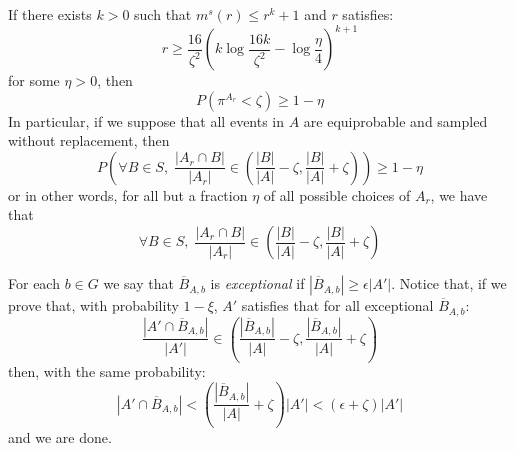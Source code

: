     \begin{remark}[Fact 5.12]\label{fact_5.12}
        If there exists $k > 0$ such that $m^s(r) \leq r^k + 1$ and $r$ satisfies:
        $$
            r \geq \frac{16}{\zeta^2} \left( k \log \frac{16 k}{\zeta^2} - \log \frac{\eta}{4} \right)^{k+1}
        $$
        for some $\eta > 0$, then
        $$
            P\left( \pi^{A_r} < \zeta \right) \geq 1 - \eta
        $$
        In particular, if we suppose that all events in $A$ are equiprobable and sampled without replacement, then
        $$
            P\left( \forall B \in S, \; \frac{\left| A_r \cap B \right|}{\left| A_r \right|} \in
                 \left( \frac{\left| B \right|}{\left| A \right|} -
                 \zeta, \frac{\left| B \right|}{\left| A \right|} + \zeta \right) \right) \geq 1 - \eta
        $$
        or in other words, for all but a fraction $\eta$ of all possible choices of $A_r$, we have that
        $$
            \forall B \in S, \; \frac{\left| A_r \cap B \right|}{\left| A_r \right|} \in
                 \left( \frac{\left| B \right|}{\left| A \right|} -
                 \zeta, \frac{\left| B \right|}{\left| A \right|} + \zeta \right)
        $$
    \end{remark}


            \item For each $b \in G$ we say that $\overline{B}_{A,b}$ is \emph{exceptional} if
                $\left| \overline{B}_{A,b} \right| \geq \epsilon \left| A' \right|$.
                Notice that, if we prove that, with probability $1-\xi$, $A'$ satisfies that for all exceptional $\overline{B}_{A,b}$:
                $$
                    \frac{\left| A' \cap \overline{B}_{A,b} \right|}{\left| A' \right|} \in
                         \left( \frac{\left| \overline{B}_{A,b} \right|}{\left| A \right|} -
                         \zeta, \frac{\left| \overline{B}_{A,b} \right|}{\left| A \right|} + \zeta \right)
                $$
                then, with the same probability:
                \begin{equation}\label{eq:equation1}
                    \left| A' \cap \overline{B}_{A,b} \right| < \left( \frac{\left| \overline{B}_{A,b} \right|}{|A|} + \zeta \right) |A'|
                        < \left( \epsilon + \zeta \right) |A'|
                \end{equation}
                and we are done.

